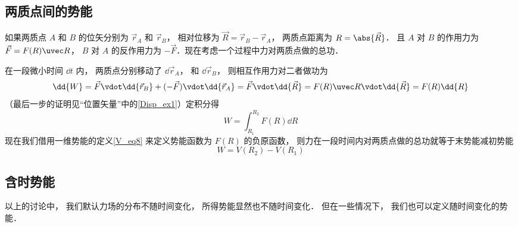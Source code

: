 \subsection{两质点间的势能}

如果两质点 $A$ 和 $B$ 的位矢分别为 $\vec r_A$ 和 $\vec r_B$， 相对位移为 $\vec R = \vec r_B - \vec r_A$， 两质点距离为 $R = \abs{\vec R}$． 且 $A$ 对 $B$ 的作用力为 $\vec F = F(R) \uvec R$， $B$ 对 $A$ 的反作用力为 $-\vec F$．现在考虑一个过程中力对两质点做的总功．

在一段微小时间 $\dd{t}$ 内， 两质点分别移动了 $\dd{\vec r_A}$， 和 $\dd{\vec r_B}$， 则相互作用力对二者做功为
\begin{equation}
\dd{W} = \vec F \vdot \dd{\vec r_B} + (- \vec F) \vdot \dd{\vec r_A} = \vec F \vdot \dd{\vec R}
= F(R)\uvec R\vdot \dd{\vec R} = F(R) \dd{R}
\end{equation}
（最后一步的证明见“位置矢量”中的\autoref{Disp_ex1}）定积分得
\begin{equation}
W = \int_{R_1}^{R_2}  F(R) \dd{R}
\end{equation}
现在我们借用一维势能的定义\autoref{V_eq8} 来定义势能函数为 $F(R)$ 的负原函数， 则力在一段时间内对两质点做的总功就等于末势能减初势能
\begin{equation}\label{V_eq20}
W = V(R_2) - V(R_1)
\end{equation}


\subsection{含时势能}
以上的讨论中， 我们默认力场的分布不随时间变化， 所得势能显然也不随时间变化． 但在一些情况下， 我们也可以定义随时间变化的势能．








